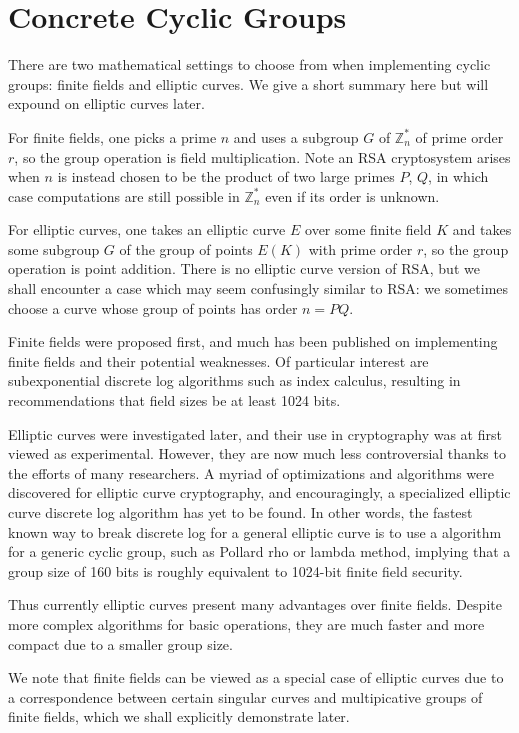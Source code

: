 \section{Concrete Cyclic Groups}

There are two mathematical settings to choose from
when implementing cyclic groups: finite fields and elliptic curves.
We give a short summary here but will expound on elliptic curves later.

For finite fields, one picks a prime $n$ and uses
a subgroup $G$ of $\mathbb{Z}_n^*$
of prime order $r$, so the group operation is field multiplication.
Note an RSA cryptosystem arises when $n$ is instead chosen to be the
product of two
large primes $P$, $Q$, in which case computations are still possible
in $\mathbb{Z}_n^*$ even if its order is unknown.

For elliptic curves, one takes an elliptic curve $E$ over some
finite field $K$ and takes some subgroup $G$ of the group of points
$E(K)$ with prime order $r$, so the group operation is point addition.
There is no elliptic curve version of RSA, but we shall encounter
a case which may seem confusingly similar to RSA: we sometimes choose
a curve whose group of points has order $n = PQ$.

Finite fields were proposed first, and much has been published
on implementing finite fields and their potential weaknesses.
Of particular interest are subexponential discrete log
algorithms such as index calculus, resulting in recommendations that
field sizes be at least 1024 bits.

Elliptic curves were investigated later, and their use in cryptography
was at first viewed as experimental. However, they are now much less
controversial thanks to the efforts of many researchers. A myriad
of optimizations
and algorithms were discovered for elliptic curve cryptography,
and encouragingly, a specialized elliptic curve discrete log algorithm
has yet to be found. In other words, the fastest known way to break discrete log
for a general elliptic curve is to use a algorithm for a generic
cyclic group, such as Pollard rho or lambda method, implying that a group
size of 160 bits is roughly equivalent to 1024-bit finite field security.

Thus currently elliptic curves present many advantages over finite fields.
Despite more complex algorithms for basic operations, they are much faster
and more compact due to a smaller group size.

We note that finite fields can be viewed as a special case of elliptic
curves due to a correspondence between certain singular curves and
multipicative groups of finite fields, which we shall explicitly demonstrate
later.

